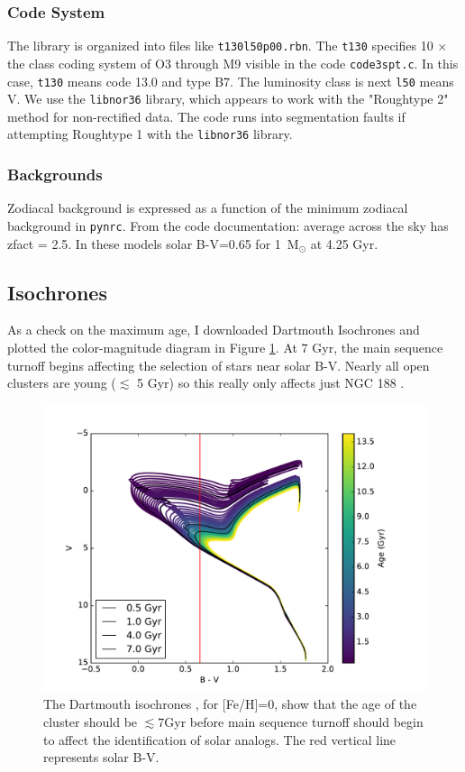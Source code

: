 \documentclass{aastex6}
\begin{document}
\subsubsection{Code System}
The library is organized into files like \texttt{t130l50p00.rbn}.
The \texttt{t130} specifies 10 $\times$ the class coding system of O3 through M9 visible in the code \texttt{code3spt.c}.
In this case, \texttt{t130} means code 13.0 and type B7.
The luminosity class is next \texttt{l50} means V.
We use the \texttt{libnor36} library, which appears to work with the "Roughtype 2" method for non-rectified data.
The code runs into segmentation faults if attempting Roughtype 1 with the \texttt{libnor36} library.


\subsubsection{Backgrounds}

Zodiacal background is expressed as a function of the minimum zodiacal background in \texttt{pynrc}.
From the code documentation: average across the sky has zfact = 2.5.
In these models solar B-V=0.65 for 1~M$_\odot$ at 4.25 Gyr.

\subsection{Isochrones}

As a check on the maximum age, I downloaded Dartmouth Isochrones \citep{dotter2008dartmouth} and plotted the color-magnitude diagram in Figure \ref{fig:isochrones}.
At 7 Gyr, the main sequence turnoff begins affecting the selection of stars near solar B-V.
Nearly all open clusters are young ($\lesssim$ 5 Gyr) so this really only affects just NGC 188 \citep[7.1 Gyr][]{elsanhoury2016ngc188}.

\begin{figure}[!hbtp]
\centering
\includegraphics[width=.7\columnwidth]{hr_isochrones.pdf}
\caption{The Dartmouth isochrones \citep{dotter2008dartmouth}, for [Fe/H]=0, show that the age of the cluster should be $\lesssim 7 $Gyr before main sequence turnoff should begin to affect the identification of solar analogs.
The red vertical line represents solar B-V.}\label{fig:isochrones}
\end{figure}
\end{document}
